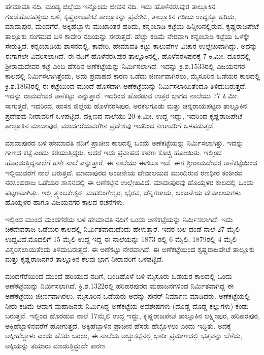 ಹೇಮಾವತಿ ನದಿ, ಮಂಡ್ಯ ಜಿಲ್ಲೆಯ ಇನ್ನೊಂದು ಜೀವನ ನದಿ. ಇದು ಹೊಳೆನರಸಿಪುರ ತಾಲ್ಲೂಕಿನ ಗೂಡೆ\break ಹೊಸಹಳ್ಳಿಯ ಬಳಿ, ಕೃಷ್ಣರಾಜಪೇಟೆ ತಾಲ್ಲೂಕನ್ನು ಪ್ರವೇಶಿಸಿ, ತಾಲ್ಲೂಕಿನ ಗಡಿಯ ಉದ್ದಕ್ಕೂ ಹರಿದು, ಮಾದಾಪುರ, ಮಂದಗೆರೆ, ಅಕ್ಕಿಹೆಬ್ಬಾಳು ಮುಖಾಂತರ ಹರಿದು, ಕನ್ನಂಬಾಡಿ ಕಟ್ಟೆಯ ಹಿನ್ನೀರಿನಲ್ಲಿರುವ, ಕೃಷ್ಣರಾಜಪೇಟೆ ತಾಲ್ಲೂಕು ಸಂಗಮದ ಬಳಿ ಕಾವೇರಿ ನದಿಯನ್ನು ಸೇರುತ್ತದೆ. ಹೆಚ್ಚು ಕಡಿಮೆ ನೇರವಾಗಿ ಕನ್ನಂಬಾಡಿ ಕಟ್ಟೆಯ ಒಳಕ್ಕೇ ಸೇರುತ್ತಿದೆ. ಕನ್ನಂಬಾಡಿಯ ಶಾಸನದಲ್ಲಿ, ಕಾವೇರಿ, ಹೇಮಾವತಿ ಕಟ್ಟು ಕಾಲುವೆಗಳ ವಿಚಾರ ಉಲ್ಲೇಖವಾಗಿದ್ದು, ಅದನ್ನು ಈಗಾಗಲೇ ವಿವರಿಸಲಾಗಿದೆ. ಈ ನದಿಗೆ ಹೊಳೆನರಸಿಪುರ ತಾಲ್ಲೂಕಿನಲ್ಲಿ, ಹೊಳೆನರಸಿಪುರಕ್ಕೆ 7 ಕಿ.ಮೀ. ದೂರದಲ್ಲಿ ಶ‍್ರೀರಾಮದೇವರ ಕಟ್ಟೆ ಎಂಬ ಹೆಸರಿನ ಅಣೆಕಟ್ಟೆಯನ್ನು ನಿರ್ಮಿಸಲಾಗಿದೆ. ಇದನ್ನು ಕ್ರಿ.ಶ.1533ರಲ್ಲಿ ವಿಜಯನಗರ ಕಾಲದಲ್ಲಿ ನಿರ್ಮಿಸಲಾಗಿತ್ತೆಂದು, ಅದು ಪ್ರವಾಹದ ಕಾರಣ ಒಡೆದು ಜೀರ್ಣವಾಗಿರಲು, ಮೈಸೂರಿನ ಒಡೆಯರ ಕಾಲದಲ್ಲಿ ಕ್ರಿ.ಶ.1863ರಲ್ಲಿ ಈ ಕಟ್ಟೆಯಿಂದ ಮುಂದೆ ಹೊಸದಾಗಿ ಅಣೆಕಟ್ಟೆಯನ್ನು ನಿರ್ಮಿಸಲಾಯಿತೆಂದೂ ತಿಳಿದುಬರುತ್ತದೆ. ಇದನ್ನು ರಾಮದೇವರ ಅಣೆಕಟ್ಟು ಎನ್ನುತ್ತಾರೆ. ಇದರಿಂದ ಹೊರಡುವ ಉತ್ತರ ಭಾಗದ ನಾಲೆಯು 77 ಕಿ.ಮೀ. ಸಾಗುತ್ತದೆ. ಇದರಿಂದ, ಹಾಸನ ಜಿಲ್ಲೆಯ ಹೊಳೆನರಸಿಪುರ, ಅರಕಲಗೂಡು ಮತ್ತು ಚನ್ನರಾಯಪಟ್ಟಣ ತಾಲ್ಲೂಕಿನ ಪ್ರದೇಶವು ನೀರಾವರಿಗೆ ಒಳಪಟ್ಟಿದೆ. ದಕ್ಷಿಣದ ನಾಲೆಯು 20 ಕಿ.ಮೀ. ಉದ್ದ ಇದ್ದು, ಇದರಿಂದ ಕೃಷ್ಣರಾಜಪೇಟೆ ತಾಲ್ಲೂಕಿನ ಮಾದಾಪುರ, ಮಂದಗರೆಯವರೆಗಿನ ಪ್ರದೇಶವು ಇದರಿಂದ ನೀರಾವರಿಗೆ ಒಳಪಡುತ್ತದೆ.

ಮಾದಾಪುರದ ಬಳಿ ಹೇಮಾವತಿ ನದಿಗೆ ಪ್ರಾಚೀನ ಕಾಲದಲ್ಲಿ ಒಂದು ಅಣೆಕಟ್ಟೆಯನ್ನು ನಿರ್ಮಿಸಲಾಗಿತ್ತು. ಇದನ್ನು ಗಾಣದ ಕಟ್ಟೆ ಎಂದು ಕರೆಯುತ್ತಿದ್ದರು. ಆದರೆ ಇದು ಪ್ರವಾಹದ ಕಾರಣ ಕೊಚ್ಚಿ ಹೋಯಿತು. ಇಲ್ಲಿಂದ ಹೊರಡುತ್ತಿದ್ದ\break ನಾಲೆಗೆ ಹಳೇ ನಾಲೆ ಎನ್ನುತ್ತಾರೆ. ಈ ನಾಲೆಯು ಈಗಲೂ ಇದೆ. ಈಗ ಶ‍್ರೀರಾಮದೇವರ ಅಣೆಕಟ್ಟೆಯಿಂದ ಇಲ್ಲಿಯ\-ವರೆಗೆ ನಾಲೆ ಬರುತ್ತದೆ. ಮಾದಾಪುರದ ಆಂಜನೇಯ ದೇವಾಲಯದ ಮುಂದಿರುವ ರಣಧೀರ ಕಂಠೀರವ ನರಸಿಂಹರಾಜ ಒಡೆಯರ ಶಾಸನದಲ್ಲಿ ಈ ಅಣೆಕಟ್ಟಿನ ಉಲ್ಲೇಖವಿದೆ. ಮಾದಾಪುರವು ಹೊಯ್ಸಳರ ಕಾಲದಲ್ಲಿ ಒಂದು ಪಟ್ಟಣವಾಗಿತ್ತು. ಇಲ್ಲಿ ತ್ರ್ಯಂಬಕೇಶ್ವರ, ಮಹಲಿಂಗೇಶ್ವರ, ಭೈರವ, ಚೆನ್ನಿಗರಾಯ, ಆಂಜನೇಯ ದೇವಾಲಯಗಳು ಹೊಯ್ಸಳರ ಹಾಗೂ ವಿಜಯನಗರ ಕಾಲದ ರಚನೆಗಳು.

ಇಲ್ಲಿಂದ ಮುಂದೆ ಮಂದಗೆರೆಯ ಬಳಿ ಹೇಮಾವತಿ ನದಿಗೆ ಒಂದು ಅಣೆಕಟ್ಟೆಯನ್ನು ನಿರ್ಮಿಸಲಾಗಿದೆ. ಇದು ಚಿಕದೇವರಾಜ ಒಡೆಯರ ಕಾಲದಲ್ಲಿ ನಿರ್ಮಿತವಾದುದೆಂದು ಹೇಳುತ್ತಾರೆ. ಇದರ ಬಲ ದಂಡೆ ನಾಲೆ 27 ಮೈಲಿ ಉದ್ದವಿದೆ.\break ಮೊದಲಿಗೆ 15 ಮೈಲಿ ಉದ್ದ ಇದ್ದ ಈ ನಾಲೆಯನ್ನು 1873 ರಲ್ಲಿ 6 ಮೈಲಿ, 1879ರಲ್ಲಿ 4 ಮೈಲಿ ವಿಸ್ತರಿಸಲಾಯಿತೆಂದು ತಿಳಿದುಬರುತ್ತದೆ. ಈ ಅಣೆಕಟ್ಟು ನೇರವಾಗಿದೆ. ಈ ಅಣೆಕಟ್ಟೆಯಿಂದ ಕೃಷ್ಣರಾಜಪೇಟೆ ತಾಲ್ಲೂಕು ಮತ್ತು ಕೃಷ್ಣರಾಜನಗರ ತಾಲ್ಲೂಕಿನ ಕೆಲವು ಭಾಗ ನೀರಾವರಿಗೆ ಒಳಪಟ್ಟಿದೆ.

ಮಂದಗೆರೆಯಿಂದ ಮುಂದೆ ಹರಿಯುವ ನದಿಗೆ, ಬಂಡಿಹೊಳೆ ಬಳಿ ಮೈಸೂರು ಒಡೆಯರ ಕಾಲದಲ್ಲಿ ಒಂದು ಅಣೆಕಟ್ಟೆಯನ್ನು ನಿರ್ಮಿಸಲಾಗಿದೆ. ಕ್ರಿ.ಶ.1322ರಲ್ಲಿ ಹರಿಹರಪುರದ ಮಹಾಜನಗಳಿಂದ ನಿರ್ಮಿತವಾಗಿದ್ದ ಈ ಅಣೆಕಟ್ಟೆಯು ಜೀರ್ಣವಾಗಿರಲು, ಮೈಸೂರಿನ ಒಡೆಯರು ಅದನ್ನು ಪುನರ್​ ನಿರ್ಮಾಣ ಮಾಡಿದರು. ಅಣೆಕಟ್ಟೆಯಲ್ಲಿ ನೀರು ಕಡಿಮೆ ಆದಾಗ ಮಹಾಜನರು ನಿರ್ಮಿಸಿದ್ದ ಅಣೆಕಟ್ಟೆಯ ಅವಶೇಷಗಳು (ದೊಡ್ಡ ದೊಡ್ಡ ಕಲ್ಲುಗಳು) ಕಂಡು ಬರುತ್ತವೆ. ಇಲ್ಲಿಂದ ಹೊರಡುವ ನಾಲೆ 17ಮೈಲಿ ಉದ್ದ ಇದ್ದು, ಕೃಷ್ಣರಾಜಪೇಟೆ ತಾಲ್ಲೂಕಿನ ಲಕ್ಷ್ಮೀಪುರ, ಹರಿಹರಪುರ, ಅಕ್ಕಿಹೆಬ್ಬಾಳಿನವರೆಗೆ ಹೋಗುತ್ತದೆ. ಅಕ್ಕಿಹೆಬ್ಬಾಳಿನ ಪ್ರಾಚೀನ ಹೆಸರು ಹೆಬ್ಬೊಳಲು ಎಂದು ಇದ್ದಿತು. ಅದಕ್ಕೆ ಅಕ್ಕೀಹೆಬ್ಬಾಳು ಎಂದು ಹೆಸರು ಬರಲು, ಈ ನಾಲೆಯ ಅಚ್ಚುಕಟ್ಟಿನಲ್ಲಿ ಭಾರೀ ಪ್ರಮಾಣದಲ್ಲಿ ಭತ್ತವನ್ನು ಬೆಳೆದು, ಅಕ್ಕಿಯನ್ನು ತಯಾರು ಮಾಡುತ್ತಿದ್ದುದೇ ಕಾರಣ.

